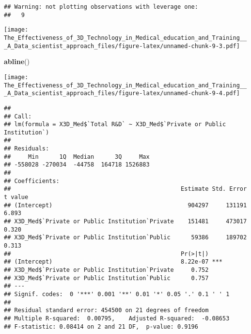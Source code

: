 \documentclass[]{article}
\newenvironment{Shaded}{\begin{snugshade}}{\end{snugshade}}
\newcommand{\CommentTok}[1]{\textcolor[rgb]{0.56,0.35,0.01}{\textit{#1}}}
\newcommand{\DataTypeTok}[1]{\textcolor[rgb]{0.13,0.29,0.53}{#1}}
\newcommand{\KeywordTok}[1]{\textcolor[rgb]{0.13,0.29,0.53}{\textbf{#1}}}
\newcommand{\NormalTok}[1]{#1}
\newcommand{\OperatorTok}[1]{\textcolor[rgb]{0.81,0.36,0.00}{\textbf{#1}}}
\newcommand{\StringTok}[1]{\textcolor[rgb]{0.31,0.60,0.02}{#1}}
\begin{document}
\begin{verbatim}
## Warning: not plotting observations with leverage one:
##   9
\end{verbatim}

\texttt{[image: The\_Effectiveness\_of\_3D\_Technology\_in\_Medical\_education\_and\_Training\_\_\_A\_Data\_scientist\_approach\_files/figure-latex/unnamed-chunk-9-3.pdf]}

\begin{Shaded}
\begin{Highlighting}[]
\KeywordTok{abline}\NormalTok{()}
\end{Highlighting}
\end{Shaded}

\texttt{[image: The\_Effectiveness\_of\_3D\_Technology\_in\_Medical\_education\_and\_Training\_\_\_A\_Data\_scientist\_approach\_files/figure-latex/unnamed-chunk-9-4.pdf]}

\begin{Shaded}
\end{Shaded}

\begin{verbatim}
## 
## Call:
## lm(formula = X3D_Med$`Total R&D` ~ X3D_Med$`Private or Public Institution`)
## 
## Residuals:
##     Min      1Q  Median      3Q     Max 
## -558028 -270034  -44758  164718 1526883 
## 
## Coefficients:
##                                                 Estimate Std. Error t value
## (Intercept)                                       904297     131191   6.893
## X3D_Med$`Private or Public Institution`Private    151481     473017   0.320
## X3D_Med$`Private or Public Institution`Public      59386     189702   0.313
##                                                 Pr(>|t|)    
## (Intercept)                                     8.22e-07 ***
## X3D_Med$`Private or Public Institution`Private     0.752    
## X3D_Med$`Private or Public Institution`Public      0.757    
## ---
## Signif. codes:  0 '***' 0.001 '**' 0.01 '*' 0.05 '.' 0.1 ' ' 1
## 
## Residual standard error: 454500 on 21 degrees of freedom
## Multiple R-squared:  0.00795,    Adjusted R-squared:  -0.08653 
## F-statistic: 0.08414 on 2 and 21 DF,  p-value: 0.9196
\end{verbatim}
\end{document}

